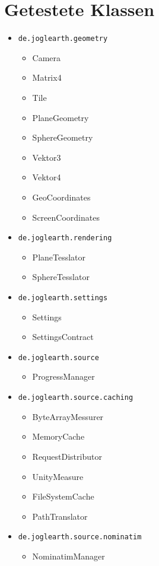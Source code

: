 \documentclass[10pt]{scrreprt}
\begin{document}
\section{Getestete Klassen}
\begin{itemize}
\item \texttt{de.joglearth.geometry}
 \begin{itemize}
 \item Camera
 \item Matrix4
 \item Tile
 \item PlaneGeometry
 \item SphereGeometry
 \item Vektor3
 \item Vektor4
 \item GeoCoordinates
 \item ScreenCoordinates
 \end{itemize}
\item \texttt{de.joglearth.rendering}
 \begin{itemize}
 \item PlaneTesslator
 \item SphereTesslator
 \end{itemize}
 \item \texttt{de.joglearth.settings}
 \begin{itemize}
 \item Settings
 \item SettingsContract
 \end{itemize}
 \item \texttt{de.joglearth.source}
 \begin{itemize}
 \item ProgressManager
 \end{itemize}
 \item \texttt{de.joglearth.source.caching}
 \begin{itemize}
 \item ByteArrayMessurer
 \item MemoryCache
 \item RequestDistributor
 \item UnityMeasure
 \item FileSystemCache
 \item PathTranslator
 \end{itemize}
 \item \texttt{de.joglearth.source.nominatim}
 \begin{itemize}
 \item NominatimManager

\end{itemize}
\end{itemize}
\end{document}
